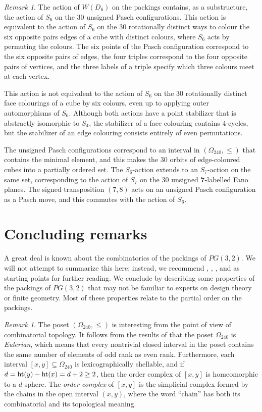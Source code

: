 \documentclass{amsart}
\theoremstyle{plain}
\theoremstyle{definition}
\theoremstyle{remark}
\newtheorem{rmk}[theorem]{Remark}
\numberwithin{equation}{section}
\newcommand{\rootht}{\text{\rm ht}}
\newcommand{\seven}{{\mathbf 7}}
\newcommand{\qpx}{\Omega_{240}}
\begin{document}
\begin{rmk}\label{rmk:cubeedge}
The action of $W(D_6)$ on the packings contains, as a substructure, the action of $S_6$ on the $30$
unsigned Pasch configurations. This action is equivalent to the action of $S_6$ on the $30$ rotationally
distinct ways to colour the six opposite pairs edges of a cube with distinct colours, where $S_6$ acts by 
permuting the colours. The six points of the Pasch configuration correspond to the six opposite pairs of
edges, the four triples correspond to the four opposite pairs of vertices, and the three labels of a
triple specify which three colours meet at each vertex.

This action is not equivalent to the action of $S_6$ on the $30$ rotationally distinct face colourings of
a cube by six colours, even up to applying outer automorphisms of $S_6$. Although both actions have a point 
stabilizer that is abstractly isomorphic to $S_4$, the stabilizer of a face colouring contains $4$-cycles,
but the stabilizer of an edge colouring consists entirely of even permutations.

The unsigned Pasch configurations correspond to an interval in $(\qpx, \leq)$ that contains the minimal
element, and this makes the $30$ orbits of edge-coloured cubes into a partially ordered set. The $S_6$-action
extends to an $S_7$-action on the same set, corresponding to the action of $S_7$ on the $30$ unsigned
$\seven$-labelled Fano planes. The signed transposition $\overline{(7, 8)}$ acts on an unsigned Pasch 
configuration as a Pasch move, and this commutes with the action of $S_6$.
\end{rmk}

\section{Concluding remarks}\label{sec:conc}

A great deal is known about the combinatorics of the packings of $PG(3, 2)$. We will not attempt to summarize 
this here; instead, we recommend \cite{hirschfeld85}, \cite{mathon97overlarge}, \cite{mathon97seven}, and 
\cite{polster99} as starting points for further reading. We conclude by describing some properties of the 
packings of $PG(3, 2)$ that may not be familiar to experts on design theory or finite geometry. Most of 
these properties relate to the partial order on the packings.

\begin{rmk}\label{rmk:topology}
The poset $(\qpx, \leq)$ is interesting from the point of view of combinatorial topology. It follows from 
the results of \cite[\S6]{rains13} that the poset $\qpx$ is {\it Eulerian}, which means that every 
nontrivial closed interval in the poset contains the same number of elements of odd rank as even rank.
Furthermore, each interval $[x, y] \subseteq \qpx$ is lexicographically shellable, and if 
$d = \rootht(y) - \rootht(x) = d+2 \geq 2$, then the order complex of $[x, y]$ is homeomorphic to 
a $d$-sphere. The {\it order complex} of $[x, y]$ is the simplicial complex formed by the chains
in the open interval $(x, y)$, where the word ``chain'' has both its combinatorial and its topological
meaning.
\end{rmk}
\end{document}
